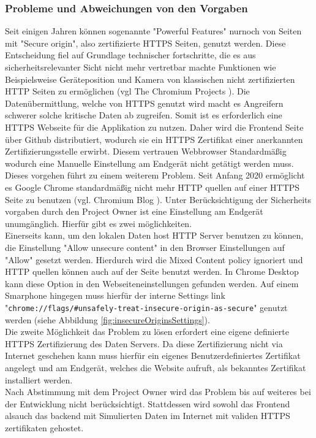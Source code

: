 \subsubsection{Probleme und Abweichungen von den Vorgaben}
Seit einigen Jahren können sogenannte "Powerful Features" nurnoch von Seiten mit "Secure origin", also zertifizierte HTTPS Seiten, genutzt werden. Diese Entscheidung fiel auf Grundlage technischer fortschritte, die es aus sicherheitsrelevanter Sicht nicht mehr vertretbar machte Funktionen wie Beispielsweise Geräteposition und Kamera von klassischen nicht zertifizierten HTTP Seiten zu ermöglichen (vgl The Chromium Projects \cite{CameraHTTPSOnly}). Die Datenübermittlung, welche von HTTPS genutzt wird macht es Angreifern schwerer solche kritische Daten ab zugreifen. Somit ist es erforderlich eine HTTPS Webseite für die Applikation zu nutzen. Daher wird die Frontend Seite über Github distributiert, wodurch sie ein HTTPS Zertifikat einer anerkannten Zertifizierungsstelle erwirbt. Diesem vertrauen Webbrowser Standardmäßig wodurch eine Manuelle Einstellung am Endgerät nicht getätigt werden muss.\\
Dieses vorgehen führt zu einem weiterem Problem. Seit Anfang 2020 ermöglicht es Google Chrome standardmäßig nicht mehr HTTP quellen auf einer HTTPS Seite zu benutzen (vgl. Chromium Blog \cite{MixedSourcesPolicy}). Unter Berücksichtigung der Sicherheits vorgaben durch den Project Owner ist eine Einstellung am Endgerät unumgänglich. Hierfür gibt es zwei möglichkeiten.\\
Einerseits kann, um den lokalen Daten host HTTP Server benutzen zu können, die Einstellung "Allow unsecure content" in den Browser Einstellungen auf "Allow" gesetzt werden. Hierdurch wird die Mixed Content policy ignoriert und HTTP quellen können auch auf der Seite benutzt werden. In Chrome Desktop kann diese Option in den Webseiteneinstellungen gefunden werden. Auf einem Smarphone hingegen muss hierfür der interne Settings link "\verb|chrome://flags/#unsafely-treat-insecure-origin-as-secure|" genutzt werden (siehe Abbildung \ref{fig:insecureOriginsSettings}).\\
Die zweite Möglichkeit das Problem zu lösen erfordert eine eigene definierte HTTPS Zertifizierung des Daten Servers. Da diese Zertifizierung nicht via Internet geschehen kann muss hierfür ein eigenes Benutzerdefiniertes Zertifikat angelegt und am Endgerät, welches die Website aufruft, als bekanntes Zertifikat installiert werden.\\ 
Nach Abstimmung mit dem Project Owner wird das Problem bis auf weiteres bei der Entwicklung nicht berücksichtigt. Stattdessen wird sowohl das Frontend alsauch das backend mit Simulierten Daten im Internet mit validen HTTPS zertifikaten gehostet.

